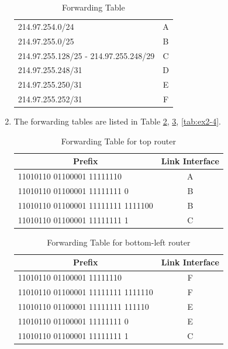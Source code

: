 \begin{exercise}[]
\begin{solution}
\begin{enumerate}
\begin{table}[h]
\begin{tabular}{lc}
      214.97.254.0/24      & A                       \\
      214.97.255.0/25                  & B                       \\
      214.97.255.128/25 - 214.97.255.248/29 & C                       \\
      214.97.255.248/31  & D                      \\
      214.97.255.250/31  & E                      \\
      214.97.255.252/31  & F                      \\\hline
      \end{tabular}
      \caption{Forwarding Table \label{tab:ex2}}
    \end{table}
    \item The forwarding tables are listed in Table \ref{tab:ex2-2}, \ref{tab:ex2-3}, \ref{tab:ex2-4}.
    \begin{table}[h]
      \centering
      \begin{tabular}{lc}
      \hline
      \multicolumn{1}{c}{\textbf{Prefix}} & \textbf{Link Interface} \\ \hline
      11010110 01100001 11111110      & A                       \\
      11010110 01100001 11111111 0    & B                       \\
      11010110 01100001 11111111 1111100 & B                      \\
      11010110 01100001 11111111 1 &C                      \\\hline
      \end{tabular}
      \caption{Forwarding Table for top router \label{tab:ex2-2}}
    \end{table}

    \begin{table}[h]
      \centering
      \begin{tabular}{lc}
      \hline
      \multicolumn{1}{c}{\textbf{Prefix}} & \textbf{Link Interface} \\ \hline
      11010110 01100001 11111110      & F                       \\
      11010110 01100001 11111111 1111110 & F                      \\
      11010110 01100001 11111111 111110 & E                      \\
      11010110 01100001 11111111 0    & E                       \\
      11010110 01100001 11111111 1 &C                      \\\hline
      \end{tabular}
      \caption{Forwarding Table for bottom-left router \label{tab:ex2-3}}
    \end{table}


\end{enumerate}
\end{solution}
\end{exercise}
